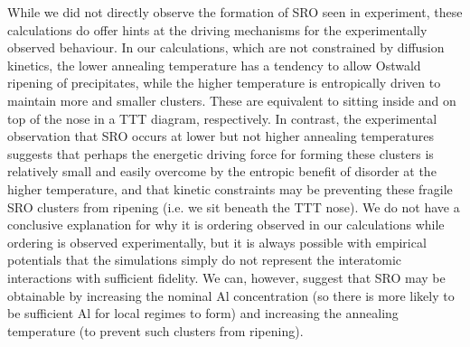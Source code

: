 While we did not directly observe the formation of \BTWO SRO seen in experiment, these calculations do offer hints at the driving mechanisms for the experimentally observed behaviour.
In our calculations, which are not constrained by diffusion kinetics, the lower annealing temperature has a tendency to allow Ostwald ripening of precipitates, while the higher temperature is entropically driven to maintain more and smaller clusters.
These are equivalent to sitting inside and on top of the nose in a TTT diagram, respectively.
In contrast, the experimental observation that SRO occurs at lower but not higher annealing temperatures suggests that perhaps the energetic driving force for forming these clusters is relatively small and easily overcome by the entropic benefit of disorder at the higher temperature, and that kinetic constraints may be preventing these fragile SRO clusters from ripening (i.e. we sit beneath the TTT nose).
We do not have a conclusive explanation for why it is \DOTHREE ordering observed in our calculations while \BTWO ordering is observed experimentally, but it is always possible with empirical potentials that the simulations simply do not represent the interatomic interactions with sufficient fidelity.
We can, however, suggest that \DOTHREE SRO may be obtainable by increasing the nominal Al concentration (so there is more likely to be sufficient Al for local \DOTHREE regimes to form) and increasing the annealing temperature (to prevent such clusters from ripening).